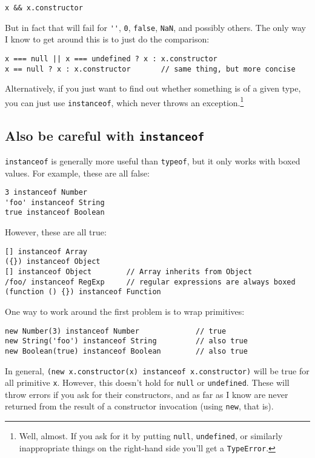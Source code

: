 \documentclass{article}
\begin{document}
\begin{verbatim}
x && x.constructor
\end{verbatim}

    But in fact that will fail for \verb|''|, \verb|0|, \verb|false|, \verb|NaN|, and possibly others. The only way I know to get around this is to just do the comparison:

\begin{verbatim}
x === null || x === undefined ? x : x.constructor
x == null ? x : x.constructor       // same thing, but more concise
\end{verbatim}

    Alternatively, if you just want to find out whether something is of a given type, you can just use \verb|instanceof|, which never throws an exception.\footnote{Well, almost. If you ask for
    it by putting {\tt null}, {\tt undefined}, or similarly inappropriate things on the right-hand side you'll get a {\tt TypeError}.}

\subsection {Also be careful with {\tt instanceof}}
    \label{sec:careful-with-instanceof}
    {\tt instanceof} is generally more useful than {\tt typeof}, but it only works with boxed values. For example, these are all false:

\begin{verbatim}
3 instanceof Number
'foo' instanceof String
true instanceof Boolean
\end{verbatim}

    \noindent However, these are all true:

\begin{verbatim}
[] instanceof Array
({}) instanceof Object
[] instanceof Object        // Array inherits from Object
/foo/ instanceof RegExp     // regular expressions are always boxed
(function () {}) instanceof Function
\end{verbatim}

    One way to work around the first problem is to wrap primitives:

\begin{verbatim}
new Number(3) instanceof Number             // true
new String('foo') instanceof String         // also true
new Boolean(true) instanceof Boolean        // also true
\end{verbatim}

    In general, {\tt (new x.constructor(x) instanceof x.constructor)} will be true for all primitive {\tt x}. However, this doesn't hold for {\tt null} or {\tt undefined}. These will throw
    errors if you ask for their constructors, and as far as I know are never returned from the result of a constructor invocation (using {\tt new}, that is).
\end{document}
